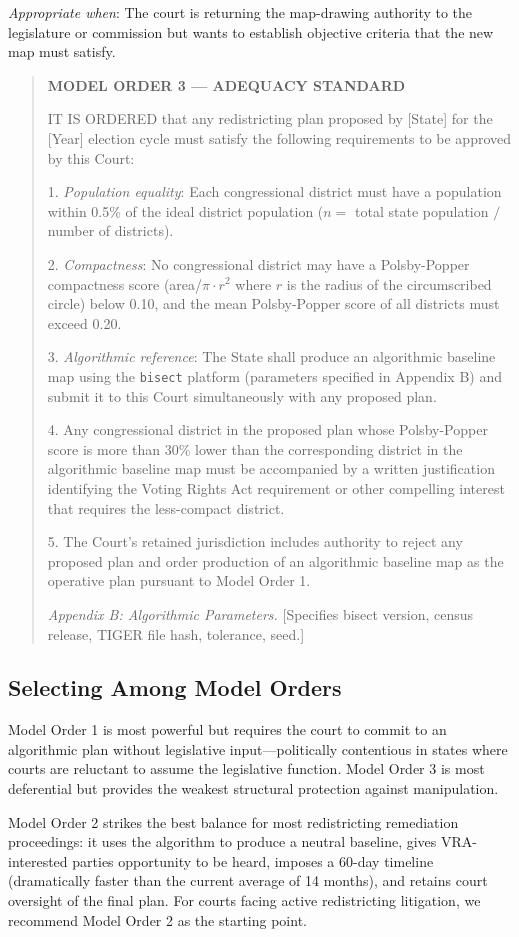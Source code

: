 \textit{Appropriate when}: The court is returning the map-drawing authority to the legislature or commission but wants to establish objective criteria that the new map must satisfy.

\begin{quote}
\textbf{MODEL ORDER 3 --- ADEQUACY STANDARD}

IT IS ORDERED that any redistricting plan proposed by [State] for the [Year] election cycle must satisfy the following requirements to be approved by this Court:

1. \textit{Population equality}: Each congressional district must have a population within 0.5\% of the ideal district population ($n = $ total state population $/$ number of districts).

2. \textit{Compactness}: No congressional district may have a Polsby-Popper compactness score (area/$\pi \cdot r^2$ where $r$ is the radius of the circumscribed circle) below 0.10, and the mean Polsby-Popper score of all districts must exceed 0.20.

3. \textit{Algorithmic reference}: The State shall produce an algorithmic baseline map using the \texttt{bisect} platform (parameters specified in Appendix B) and submit it to this Court simultaneously with any proposed plan.

4. Any congressional district in the proposed plan whose Polsby-Popper score is more than 30\% lower than the corresponding district in the algorithmic baseline map must be accompanied by a written justification identifying the Voting Rights Act requirement or other compelling interest that requires the less-compact district.

5. The Court's retained jurisdiction includes authority to reject any proposed plan and order production of an algorithmic baseline map as the operative plan pursuant to Model Order 1.

\textit{Appendix B: Algorithmic Parameters.} [Specifies bisect version, census release, TIGER file hash, tolerance, seed.]
\end{quote}

\subsection{Selecting Among Model Orders}

Model Order 1 is most powerful but requires the court to commit to an algorithmic plan without legislative input---politically contentious in states where courts are reluctant to assume the legislative function. Model Order 3 is most deferential but provides the weakest structural protection against manipulation.

Model Order 2 strikes the best balance for most redistricting remediation proceedings: it uses the algorithm to produce a neutral baseline, gives VRA-interested parties opportunity to be heard, imposes a 60-day timeline (dramatically faster than the current average of 14 months), and retains court oversight of the final plan. For courts facing active redistricting litigation, we recommend Model Order 2 as the starting point.

